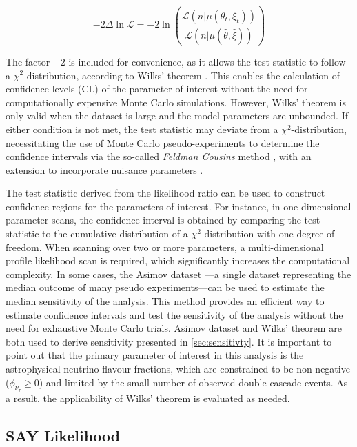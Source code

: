 \begin{equation}\label{eq:llh_ratio_TS}
    -2 \Delta \ln \mathcal{L} = -2 \ln \left( \frac{\mathcal{L}(n|\mu(\theta_t, \xi_t))}{\mathcal{L}(n|\mu(\hat{\theta}, \hat{\xi}))} \right)
\end{equation}

The factor $-2$ is included for convenience, as it allows the test statistic to follow a $\chi^2$-distribution, according to Wilks' theorem . This enables the calculation of confidence levels (CL) of the parameter of interest without the need for computationally expensive Monte Carlo simulations. However, Wilks’ theorem is only valid when the dataset is large and the model parameters are unbounded. If either condition is not met, the test statistic may deviate from a $\chi^2$-distribution, necessitating the use of Monte Carlo pseudo-experiments to determine the confidence intervals via the so-called \emph{Feldman Cousins} method , with an extension to incorporate nuisance parameters .

The test statistic derived from the likelihood ratio can be used to construct confidence regions for the parameters of interest. For instance, in one-dimensional parameter scans, the confidence interval is obtained by comparing the test statistic to the cumulative distribution of a $\chi^2$-distribution with one degree of freedom. When scanning over two or more parameters, a multi-dimensional profile likelihood scan is required, which significantly increases the computational complexity. In some cases, the Asimov dataset \cite{asimov}—a single dataset representing the median outcome of many pseudo experiments—can be used to estimate the median sensitivity of the analysis. This method provides an efficient way to estimate confidence intervals and test the sensitivity of the analysis without the need for exhaustive Monte Carlo trials. Asimov dataset and Wilks' theorem are both used to derive sensitivity presented in \ref{sec:sensitivty}. It is important to point out that the primary parameter of interest in this analysis is the astrophysical neutrino flavour fractions, which are constrained to be non-negative ($\phi_{\nu_\tau} \geq 0$) and limited by the small number of observed double cascade events. As a result, the applicability of Wilks' theorem is evaluated as needed.

\subsection{SAY Likelihood}
\label{SAY}

